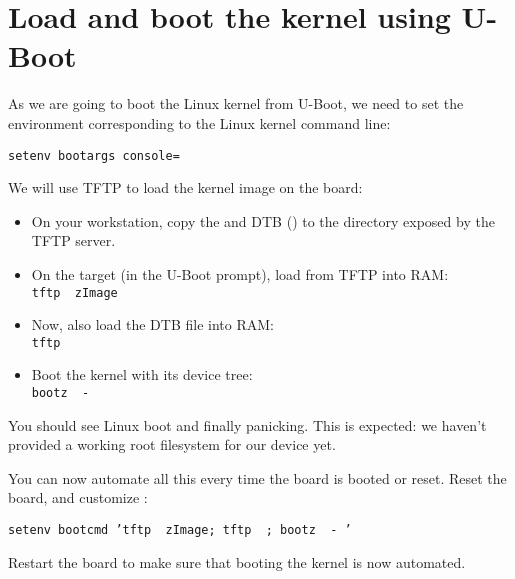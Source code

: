 \section{Load and boot the kernel using U-Boot}

As we are going to boot the Linux kernel from U-Boot,
we need to set the  environment corresponding
to the Linux kernel command line:

\texttt{setenv bootargs console=\ttyname}

We will use TFTP to load the kernel image on the board:

\begin{itemize}

\item On your workstation, copy the  and DTB
(\texttt\dtbname) to the directory exposed by the TFTP server.

\item On the target (in the U-Boot prompt), load  from
TFTP into RAM:\\
\texttt{tftp \zimageboardaddr\ zImage}

\item Now, also load the DTB file into RAM:\\
\texttt{tftp \dtbboardaddr\ \dtbname}

\item Boot the kernel with its device tree:\\
\texttt{bootz \zimageboardaddr\ - \dtbboardaddr}

\end{itemize}

You should see Linux boot and finally panicking. This is expected: we
haven't provided a working root filesystem for our device yet.

You can now automate all this every time the board is booted or
reset. Reset the board, and customize :

\footnotesize
\texttt {setenv bootcmd 'tftp \zimageboardaddr\ zImage; tftp \dtbboardaddr\ \dtbname;
bootz \zimageboardaddr\ - \dtbboardaddr'}\\
\normalsize

Restart the board to make sure that booting the kernel is now automated.

{

}
{}


{

}
{}



